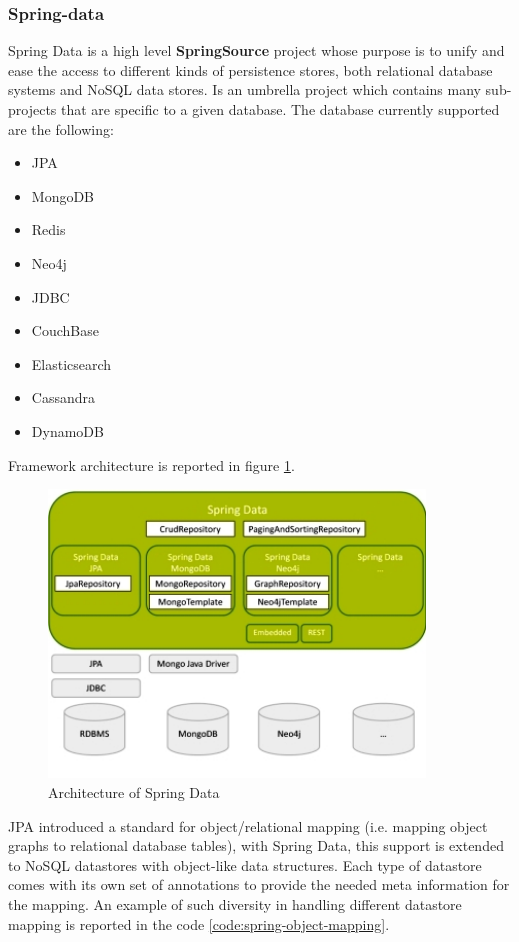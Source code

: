 \subsubsection{Spring-data}
Spring Data \cite{online:spring-data} is a high level \textbf{SpringSource} project whose purpose is to unify and ease the access to different kinds of persistence stores, both relational database systems and NoSQL data stores. Is an umbrella project which contains many sub-projects that are specific to a given database. The database currently supported are the following:
\begin{itemize}
\item JPA
\item MongoDB
\item Redis
\item Neo4j
\item JDBC
\item CouchBase
\item Elasticsearch
\item Cassandra
\item DynamoDB
\end{itemize}

\noindent Framework architecture is reported in figure \ref{fig:spring-data-overview}.

\begin{figure}[tbh]
  \centering
  \includegraphics[width=10cm]{images/spring_data_overview}
  \caption{Architecture of Spring Data \cite{online:spring-data-overview}}
  \label{fig:spring-data-overview}
\end{figure}

\noindent JPA introduced a standard for object/relational mapping (i.e. mapping object graphs to relational database tables), with Spring Data, this support is extended to NoSQL datastores with object-like data structures.
Each type of datastore comes with its own set of annotations to provide the needed meta information for the mapping. An example of such diversity in handling different datastore mapping is reported in the code \ref{code:spring-object-mapping}.

